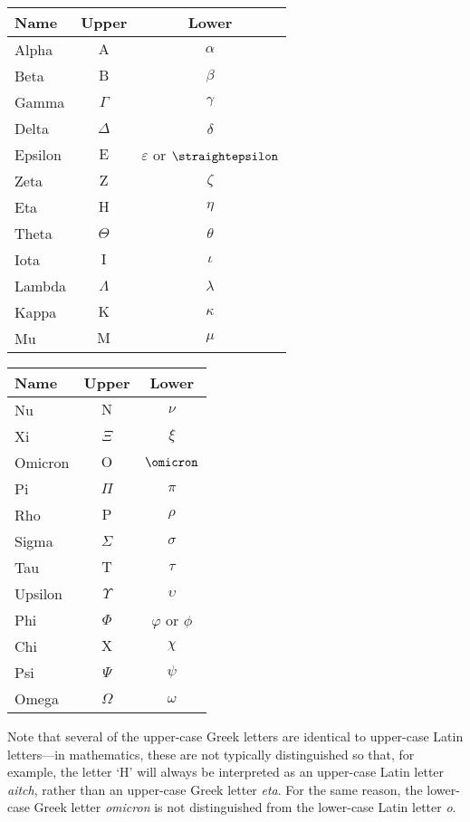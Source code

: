 \begin{center}
\begin{tabular}{l|cc}
\textbf{Name} & \textbf{Upper} & \textbf{Lower}  \\ \hline
\small Alpha   & $\mathrm{A}$ & $\alpha$ \\
\small Beta    & $\mathrm{B}$ & $\beta$ \\
\small Gamma   & $\Gamma$     & $\gamma$ \\
\small Delta   & $\Delta$     & $\delta$ \\
\small Epsilon & $\mathrm{E}$ & $\varepsilon$ or $\text{\straightepsilon}$ \\
\small Zeta    & $\mathrm{Z}$ & $\zeta$ \\
\small Eta     & $\mathrm{H}$ & $\eta$ \\
\small Theta   & $\Theta$     & $\theta$ \\
\small Iota    & $\mathrm{I}$ & $\iota$ \\
\small Lambda  & $\Lambda$    & $\lambda$ \\
\small Kappa   & $\mathrm{K}$ & $\kappa$ \\
\small Mu      & $\mathrm{M}$ & $\mu$ 
\end{tabular}
%
\hspace{20pt}
%
\begin{tabular}{l|cc}
\textbf{Name} & \textbf{Upper} & \textbf{Lower}  \\ \hline
\small Nu      & $\mathrm{N}$ & $\nu$ \\
\small Xi      & $\Xi$        & $\xi$ \\
\small Omicron & $\mathrm{O}$ & $\omicron$ \\
\small Pi      & $\Pi$        & $\pi$ \\
\small Rho     & $\mathrm{P}$ & $\rho$ \\
\small Sigma   & $\Sigma$     & $\sigma$ \\
\small Tau     & $\mathrm{T}$ & $\tau$ \\
\small Upsilon & $\Upsilon$   & $\upsilon$ \\
\small Phi     & $\Phi$       & $\varphi$ or $\phi$ \\
\small Chi     & $\mathrm{X}$ & $\chi$ \\
\small Psi     & $\Psi$       & $\psi$ \\
\small Omega   & $\Omega$     & $\omega$
\end{tabular}
\end{center}

Note that several of the upper-case Greek letters are identical to upper-case Latin letters---in mathematics, these are not typically distinguished so that, for example, the letter `H' will always be interpreted as an upper-case Latin letter \textit{aitch}, rather than an upper-case Greek letter \textit{eta}. For the same reason, the lower-case Greek letter \textit{omicron} is not distinguished from the lower-case Latin letter \textit{o}.

